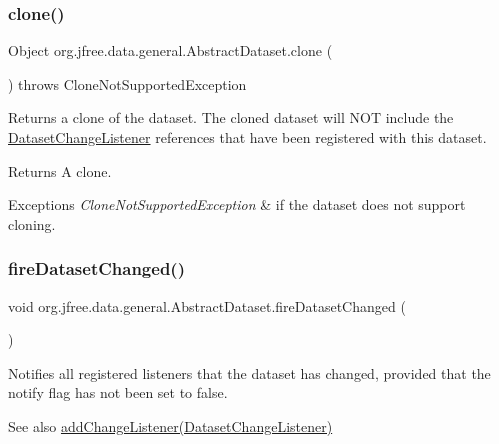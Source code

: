 \subsubsection{\texorpdfstring{clone()}{clone()}}
{\footnotesize\ttfamily Object org.\+jfree.\+data.\+general.\+Abstract\+Dataset.\+clone (\begin{DoxyParamCaption}{ }\end{DoxyParamCaption}) throws Clone\+Not\+Supported\+Exception}

Returns a clone of the dataset. The cloned dataset will N\+OT include the \mbox{\hyperlink{interfaceorg_1_1jfree_1_1data_1_1general_1_1_dataset_change_listener}{Dataset\+Change\+Listener}} references that have been registered with this dataset.

\begin{DoxyReturn}{Returns}
A clone.
\end{DoxyReturn}

\begin{DoxyExceptions}{Exceptions}
{\em Clone\+Not\+Supported\+Exception} & if the dataset does not support cloning. \\
\hline
\end{DoxyExceptions}
\mbox{\label{classorg_1_1jfree_1_1data_1_1general_1_1_abstract_dataset_a95eadb1f154c4b4310bd04792617e633}} 
\subsubsection{\texorpdfstring{fire\+Dataset\+Changed()}{fireDatasetChanged()}}
{\footnotesize\ttfamily void org.\+jfree.\+data.\+general.\+Abstract\+Dataset.\+fire\+Dataset\+Changed (\begin{DoxyParamCaption}{ }\end{DoxyParamCaption})\hspace{0.3cm}{\ttfamily [protected]}}

Notifies all registered listeners that the dataset has changed, provided that the {\ttfamily notify} flag has not been set to {\ttfamily false}.

\begin{DoxySeeAlso}{See also}
\mbox{\hyperlink{classorg_1_1jfree_1_1data_1_1general_1_1_abstract_dataset_a98ccd0af41c59cd8fe50543376d0faf9}{add\+Change\+Listener(\+Dataset\+Change\+Listener)}} 
\end{DoxySeeAlso}
\mbox{\label{classorg_1_1jfree_1_1data_1_1general_1_1_abstract_dataset_a8461feb0ca75008e174e5bf72a56f01d}} 
